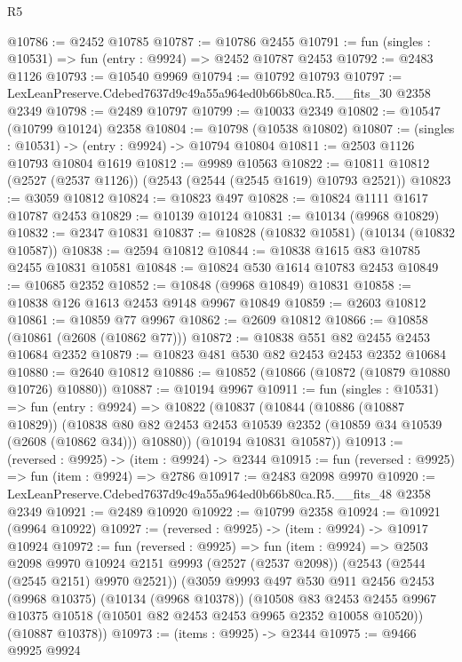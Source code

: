 \begin{lexlean}{R5}
\begin{coremodule}
@10786 := @2452 @10785
@10787 := @10786 @2455
@10791 := fun (singles : @10531) => fun (entry : @9924) => @2452 @10787 @2453
@10792 := @2483 @1126
@10793 := @10540 @9969
@10794 := @10792 @10793
@10797 := LexLeanPreserve.Cdebed7637d9c49a55a964ed0b66b80ca.R5.__fits_30 @2358 @2349
@10798 := @2489 @10797
@10799 := @10033 @2349
@10802 := @10547 (@10799 @10124) @2358
@10804 := @10798 (@10538 @10802)
@10807 := (singles : @10531) -> (entry : @9924) -> @10794 @10804
@10811 := @2503 @1126 @10793 @10804 @1619
@10812 := @9989 @10563
@10822 := @10811 @10812 (@2527 (@2537 @1126)) (@2543 (@2544 (@2545 @1619) @10793 @2521))
@10823 := @3059 @10812
@10824 := @10823 @497
@10828 := @10824 @1111 @1617 @10787 @2453
@10829 := @10139 @10124
@10831 := @10134 (@9968 @10829)
@10832 := @2347 @10831
@10837 := @10828 (@10832 @10581) (@10134 (@10832 @10587))
@10838 := @2594 @10812
@10844 := @10838 @1615 @83 @10785 @2455 @10831 @10581
@10848 := @10824 @530 @1614 @10783 @2453
@10849 := @10685 @2352
@10852 := @10848 (@9968 @10849) @10831
@10858 := @10838 @126 @1613 @2453 @9148 @9967 @10849
@10859 := @2603 @10812
@10861 := @10859 @77 @9967
@10862 := @2609 @10812
@10866 := @10858 (@10861 (@2608 (@10862 @77)))
@10872 := @10838 @551 @82 @2455 @2453 @10684 @2352
@10879 := @10823 @481 @530 @82 @2453 @2453 @2352 @10684
@10880 := @2640 @10812
@10886 := @10852 (@10866 (@10872 (@10879 @10880 @10726) @10880))
@10887 := @10194 @9967
@10911 := fun (singles : @10531) =>
  fun (entry : @9924) =>
  @10822
    (@10837
      (@10844
        (@10886 (@10887 @10829))
        (@10838 @80 @82 @2453 @2453 @10539 @2352 (@10859 @34 @10539 (@2608 (@10862 @34))) @10880))
      (@10194 @10831 @10587))
@10913 := (reversed : @9925) -> (item : @9924) -> @2344
@10915 := fun (reversed : @9925) => fun (item : @9924) => @2786
@10917 := @2483 @2098 @9970
@10920 := LexLeanPreserve.Cdebed7637d9c49a55a964ed0b66b80ca.R5.__fits_48 @2358 @2349
@10921 := @2489 @10920
@10922 := @10799 @2358
@10924 := @10921 (@9964 @10922)
@10927 := (reversed : @9925) -> (item : @9924) -> @10917 @10924
@10972 := fun (reversed : @9925) =>
  fun (item : @9924) =>
  @2503
    @2098
    @9970
    @10924
    @2151
    @9993
    (@2527 (@2537 @2098))
    (@2543 (@2544 (@2545 @2151) @9970 @2521))
    (@3059
      @9993
      @497
      @530
      @911
      @2456
      @2453
      (@9968 @10375)
      (@10134 (@9968 @10378))
      (@10508
        @83
        @2453
        @2455
        @9967
        @10375
        @10518
        (@10501 @82 @2453 @2453 @9965 @2352 @10058 @10520))
      (@10887 @10378))
@10973 := (items : @9925) -> @2344
@10975 := @9466 @9925 @9924

\end{coremodule}
\end{lexlean}
